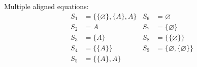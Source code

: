 \documentclass[11pt,letterpaper, fleqn]{article}
\begin{document}
Multiple aligned equations: %
\begin{align*}
S_1 &= \{\{\varnothing\}, \{A\}, A\} & S_6 &= \varnothing \\
S_2 &= A & S_7 &= \{\varnothing\} \\
S_3 &= \{A\} & S_8 &= \{\{\varnothing\}\} \\
S_4 &= \{\{A\}\} & S_9 &= \{\varnothing, \{\varnothing\}\} \\
S_5 &= \{\{A\}, A\} & &
\end{align*}
\end{document}
